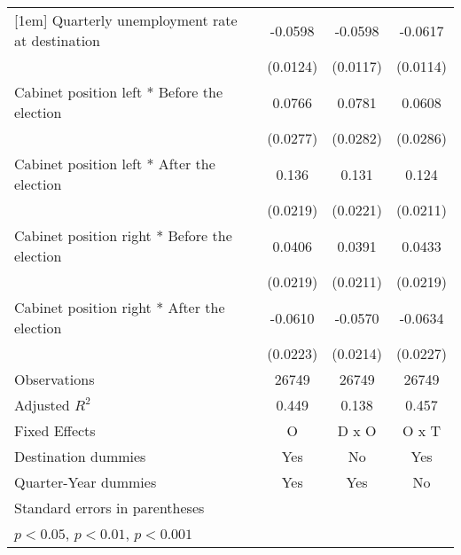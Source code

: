 \begin{table}[htbp]
\begin{tabular}{l*{3}{c}}
[1em]
Quarterly unemployment rate at destination&     -0.0598\sym{***}&     -0.0598\sym{***}&     -0.0617\sym{***}\\
                    &    (0.0124)         &    (0.0117)         &    (0.0114)         \\
[1em]
Cabinet position left * Before the election&      0.0766\sym{**} &      0.0781\sym{**} &      0.0608\sym{*}  \\
                    &    (0.0277)         &    (0.0282)         &    (0.0286)         \\
[1em]
Cabinet position left * After the election&       0.136\sym{***}&       0.131\sym{***}&       0.124\sym{***}\\
                    &    (0.0219)         &    (0.0221)         &    (0.0211)         \\
[1em]
Cabinet position right * Before the election&      0.0406         &      0.0391         &      0.0433         \\
                    &    (0.0219)         &    (0.0211)         &    (0.0219)         \\
[1em]
Cabinet position right * After the election&     -0.0610\sym{**} &     -0.0570\sym{*}  &     -0.0634\sym{**} \\
                    &    (0.0223)         &    (0.0214)         &    (0.0227)         \\
\hline
Observations        &       26749         &       26749         &       26749         \\
Adjusted \(R^{2}\)  &       0.449         &       0.138         &       0.457         \\
Fixed Effects       &           O         &       D x O         &       O x T         \\
Destination dummies &         Yes         &          No         &         Yes         \\
Quarter-Year dummies&         Yes         &         Yes         &          No         \\
\hline\hline
\multicolumn{4}{l}{\footnotesize Standard errors in parentheses}\\
\multicolumn{4}{l}{\footnotesize \sym{*} \(p<0.05\), \sym{**} \(p<0.01\), \sym{***} \(p<0.001\)}\\
\end{tabular}
\end{table}
